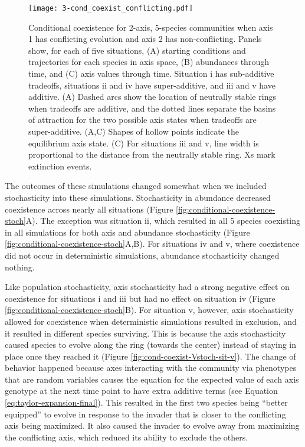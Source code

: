 \begin{figure}[ht!]
\centering
\texttt{[image: 3-cond\_coexist\_conflicting.pdf]}
\caption{Conditional coexistence for 2-axis, 5-species communities when axis 1 has 
    conflicting evolution and axis 2 has non-conflicting.
    Panels show, for each of five situations,
    (A) starting conditions and trajectories for each species in axis space, 
    (B) abundances through time, and 
    (C) axis values through time.
    Situation i has sub-additive tradeoffs, situations ii and iv have 
    super-additive, and iii and v have additive.
    (A) Dashed arcs show the location of neutrally stable rings
    when tradeoffs are additive, and 
    the dotted lines separate the basins of attraction for the two possible
    axis states when tradeoffs are super-additive.
    (A,C) Shapes of hollow points indicate the equilibrium axis state.
    (C) For situations iii and v, line width is proportional to the 
    distance from the neutrally stable ring.
    Xs mark extinction events.
}
\label{fig:conditional-coexistence}
\end{figure}


The outcomes of these simulations changed somewhat when we included stochasticity
into these simulations.
Stochasticity in abundance decreased coexistence across nearly all situations
(Figure \ref{fig:conditional-coexistence-stoch}A).
The exception was situation ii, which resulted in all 5 species coexisting 
in all simulations for both axis and abundance stochasticity
(Figure \ref{fig:conditional-coexistence-stoch}A,B).
For situations iv and v, where coexistence did not occur in deterministic
simulations, abundance stochasticity changed nothing.

Like population stochasticity, axis stochasticity had a strong negative 
effect on coexistence for situations i and iii but had no effect on
situation iv (Figure \ref{fig:conditional-coexistence-stoch}B).
For situation v, however, axis stochasticity allowed for coexistence
when deterministic simulations resulted in exclusion, 
and it resulted in different species surviving.
This is because the axis stochasticity caused species to evolve 
along the ring (towards the center) instead of staying in place once they 
reached it (Figure \ref{fig:cond-coexist-Vstoch-sit-v}).
The change of behavior happened because axes interacting with the 
community via phenotypes that are
random variables causes the equation for the expected value of each axis genotype at 
the next time point to have extra additive terms
(see Equation \ref{eq:taylor-expansion-final}).
This resulted in the first two species being ``better equipped'' to evolve in 
response to the invader that is closer to the conflicting axis being
maximized.
It also caused the invader to evolve away from maximizing the conflicting
axis, which reduced its ability to exclude the others.



